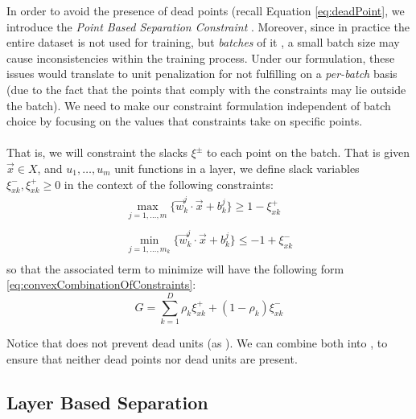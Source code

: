 In order to avoid the presence of dead points (recall Equation \ref{eq:deadPoint}, we introduce the \emph{Point Based Separation Constraint} \SepPoint. Moreover, since in practice the entire dataset is not used for training, but \emph{batches} of it \cite{LeCun06atutorial}, a small batch size may cause inconsistencies within the training process. Under our formulation,  these issues would translate to unit penalization for not fulfilling \SepUnit on a \emph{per-batch} basis (due to the fact that the points that comply with the constraints may lie outside the batch).  We need to make our constraint formulation independent of batch choice by focusing on the values that constraints take on specific points. 
\\\\
That is, we will constraint the slacks $\xi^{\pm}$ to each point on the batch. That is given $\vec{x}\in X$, and $u_1,\ldots,u_m$ unit functions in a layer, we define slack variables $\xi^{-}_{xk},\xi^{+}_{xk}\geq 0$ in the context of the following constraints:
\begin{equation}\label{eq:pointSeparationConstraint}
\begin{array}{lcl}
    \displaystyle\max_{j=1,\ldots,m}\{\vec{w}^j_k\cdot\vec{x}+b^j_k\}\geq 1-\xi^{+}_{xk}\\\\
    \displaystyle\min_{j=1,\ldots,m_k}\{\vec{w}^j_k\cdot\vec{x}+b^j_k\}\leq -1+\xi^{-}_{xk}\\
\end{array}    
\end{equation}
so that the associated term to minimize will have the following form \ref{eq:convexCombinationOfConstraints}:
\begin{equation}\label{eq:convexCombinationOfConstraints}
    G = \sum_{k=1}^{D}\rho_{k}\xi^{+}_{xk}+(1-\rho_{k})\xi^{-}_{xk}
\end{equation}

Notice that \SepPoint does not prevent  dead units (as \SepUnit). We can combine both into \SepUnitPoint, to ensure that neither dead points nor dead units are present. 

\subsection{Layer Based Separation \SepLayer}\label{subsec:sepLayer}


